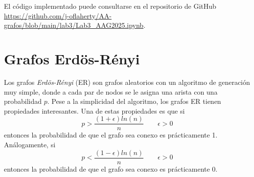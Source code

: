 \documentclass{article}
\begin{document}
El código implementado puede consultarse en el repositorio de GitHub \url{https://github.com/j-oflaherty/AA-grafos/blob/main/lab3/Lab3_AAG2025.ipynb}.


\section{Grafos Erdös-Rényi}
\label{sec:grafos_er}

Los grafos \emph{Erdös-Rényi}\cite{erdos1959random} (ER) son grafos aleatorios con un algoritmo de generación muy simple, donde
a cada par de nodos se le asigna una arista con una probabilidad $p$. Pese a la simplicidad del algoritmo,
los grafos ER tienen propiedades interesantes. Una de estas propiedades es que si 
\begin{equation}
    \label{eq:er_threshold_1}
    p > \frac{(1 + \epsilon)ln(n)}{n} \quad\quad \epsilon > 0
\end{equation}
entonces la probabilidad de que el grafo sea conexo es prácticamente 1. Análogamente,
si 
\begin{equation}
    \label{eq:er_threshold_2}
    p < \frac{(1 - \epsilon)ln(n)}{n} \quad\quad \epsilon > 0
\end{equation}
entonces la probabilidad de que el grafo sea conexo es prácticamente 0.
\end{document}
